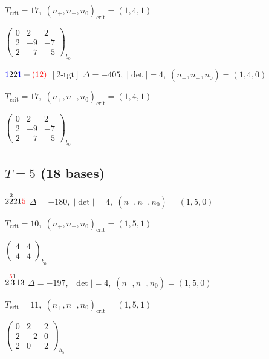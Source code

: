 \documentclass[10pt]{article}
\begin{document}
\hspace{1em}$T_{\text{crit}}=17,\; (n_+,n_-,n_0)_{\text{crit}}=(1,4,1)$

\hspace{2em}$\left(\begin{smallmatrix}0 & 2 & 2 \\ 2 & -9 & -7 \\ 2 & -7 & -5\end{smallmatrix}\right)_{\!b_0}$

\smallskip

$\textcolor{blue}{1}22\textcolor{blue}{1}+\textcolor{red}{(12)}$ $\scriptstyle [2\text{-tgt}]$ \quad $\Delta=-405,\; |\det|=4,\; (n_+,n_-,n_0)=(1,4,0)$

\hspace{1em}$T_{\text{crit}}=17,\; (n_+,n_-,n_0)_{\text{crit}}=(1,4,1)$

\hspace{2em}$\left(\begin{smallmatrix}0 & 2 & 2 \\ 2 & -9 & -7 \\ 2 & -7 & -5\end{smallmatrix}\right)_{\!b_0}$


\subsection*{$T = 5$ \quad (18 bases)}
\smallskip

$2\overset{2}{2}21\textcolor{red}{5}$ \quad $\Delta=-180,\; |\det|=4,\; (n_+,n_-,n_0)=(1,5,0)$

\hspace{1em}$T_{\text{crit}}=10,\; (n_+,n_-,n_0)_{\text{crit}}=(1,5,1)$

\hspace{2em}$\left(\begin{smallmatrix}4 & 4 \\ 4 & 4\end{smallmatrix}\right)_{\!b_0}$

\smallskip

$2\overset{\textcolor{red}{5}1}{3}13$ \quad $\Delta=-197,\; |\det|=4,\; (n_+,n_-,n_0)=(1,5,0)$

\hspace{1em}$T_{\text{crit}}=11,\; (n_+,n_-,n_0)_{\text{crit}}=(1,5,1)$

\hspace{2em}$\left(\begin{smallmatrix}0 & 2 & 2 \\ 2 & -2 & 0 \\ 2 & 0 & 2\end{smallmatrix}\right)_{\!b_0}$
\end{document}
